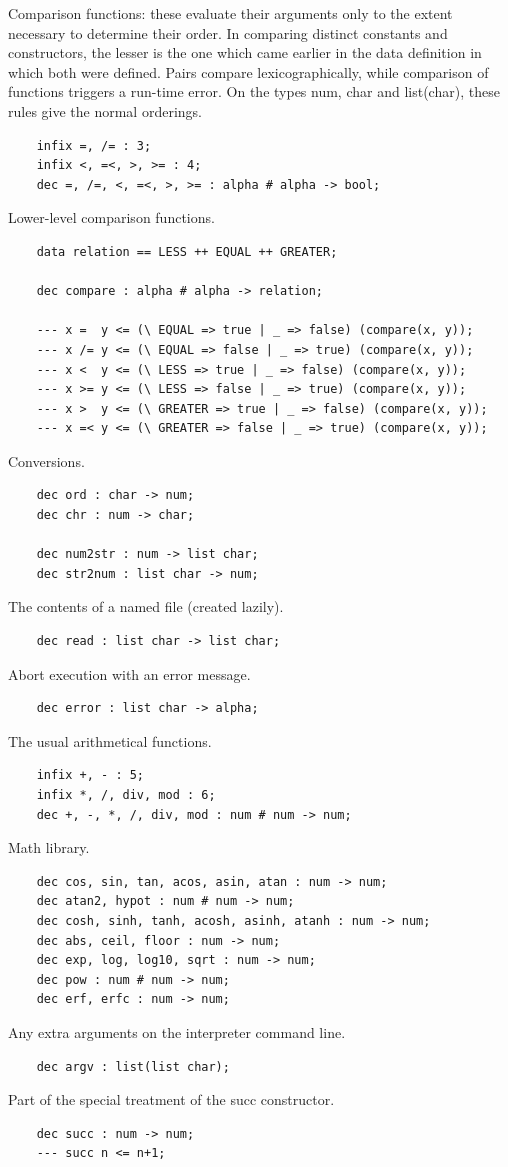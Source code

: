 Comparison functions:
these evaluate their arguments only to the extent necessary to determine
their order.  In comparing distinct constants and constructors, the
lesser is the one which came earlier in the data definition in which
both were defined.  Pairs compare lexicographically, while comparison
of functions triggers a run-time error.  On the types num, char and
list(char), these rules give the normal orderings.
\begin{verbatim}
    infix =, /= : 3;
    infix <, =<, >, >= : 4;
    dec =, /=, <, =<, >, >= : alpha # alpha -> bool;
\end{verbatim}
Lower-level comparison functions.
\begin{verbatim}
    data relation == LESS ++ EQUAL ++ GREATER;

    dec compare : alpha # alpha -> relation;

    --- x =  y <= (\ EQUAL => true | _ => false) (compare(x, y));
    --- x /= y <= (\ EQUAL => false | _ => true) (compare(x, y));
    --- x <  y <= (\ LESS => true | _ => false) (compare(x, y));
    --- x >= y <= (\ LESS => false | _ => true) (compare(x, y));
    --- x >  y <= (\ GREATER => true | _ => false) (compare(x, y));
    --- x =< y <= (\ GREATER => false | _ => true) (compare(x, y));
\end{verbatim}
Conversions.
\begin{verbatim}
    dec ord : char -> num;
    dec chr : num -> char;

    dec num2str : num -> list char;
    dec str2num : list char -> num;
\end{verbatim}
The contents of a named file (created lazily).
\begin{verbatim}
    dec read : list char -> list char;
\end{verbatim}
Abort execution with an error message.
\begin{verbatim}
    dec error : list char -> alpha;
\end{verbatim}
The usual arithmetical functions.
\begin{verbatim}
    infix +, - : 5;
    infix *, /, div, mod : 6;
    dec +, -, *, /, div, mod : num # num -> num;
\end{verbatim}
Math library.
\begin{verbatim}
    dec cos, sin, tan, acos, asin, atan : num -> num;
    dec atan2, hypot : num # num -> num;
    dec cosh, sinh, tanh, acosh, asinh, atanh : num -> num;
    dec abs, ceil, floor : num -> num;
    dec exp, log, log10, sqrt : num -> num;
    dec pow : num # num -> num;
    dec erf, erfc : num -> num;
\end{verbatim}
Any extra arguments on the interpreter command line.
\begin{verbatim}
    dec argv : list(list char);
\end{verbatim}
Part of the special treatment of the succ constructor.
\begin{verbatim}
    dec succ : num -> num;
    --- succ n <= n+1;
\end{verbatim}
